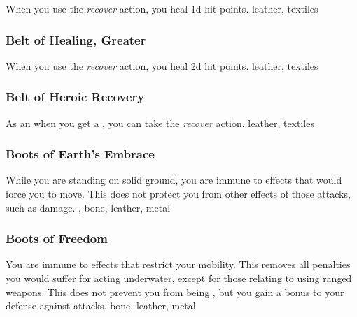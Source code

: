 When you use the \textit{recover} action, you heal \plus1d hit points.
 
 leather, textiles
\lowercase{\hypertarget{item:Belt of Healing, Greater}{}}\label{item:Belt of Healing, Greater}
\hypertarget{item:Belt of Healing, Greater}{\subsubsection{Belt of Healing, Greater\hfill{}}}
When you use the \textit{recover} action, you heal \plus2d hit points.
 
 leather, textiles
\lowercase{\hypertarget{item:Belt of Heroic Recovery}{}}\label{item:Belt of Heroic Recovery}
\hypertarget{item:Belt of Heroic Recovery}{\subsubsection{Belt of Heroic Recovery\hfill{}}}
As an  when you get a , you can take the \textit{recover} action.
 
 leather, textiles
\lowercase{\hypertarget{item:Boots of Earth's Embrace}{}}\label{item:Boots of Earth's Embrace}
\hypertarget{item:Boots of Earth's Embrace}{\subsubsection{Boots of Earth's Embrace\hfill{}}}
While you are standing on solid ground, you are immune to effects that would force you to move.
This does not protect you from other effects of those attacks, such as damage.
 , 
 bone, leather, metal
\lowercase{\hypertarget{item:Boots of Freedom}{}}\label{item:Boots of Freedom}
\hypertarget{item:Boots of Freedom}{\subsubsection{Boots of Freedom\hfill{}}}
You are immune to effects that restrict your mobility.
This removes all penalties you would suffer for acting underwater, except for those relating to using ranged weapons.
This does not prevent you from being \grappled, but you gain a  bonus to your defense against  attacks.
 
 bone, leather, metal
\lowercase{\hypertarget{item:Boots of Freedom, Greater}{}}\label{item:Boots of Freedom, Greater}
